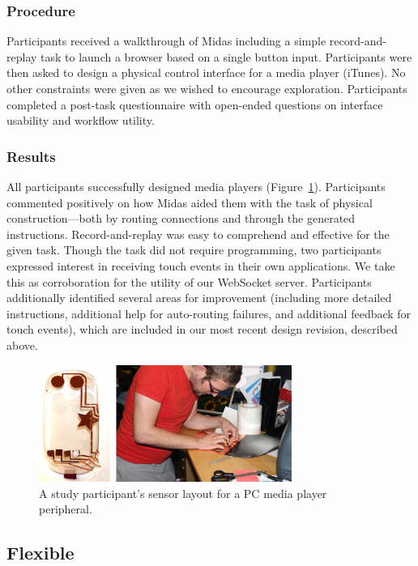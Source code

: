         \subsubsection{Procedure}
Participants received a walkthrough of Midas including a simple record-and-replay task to launch a browser based on a single button input. Participants were then asked to design a physical control interface for a media player (iTunes). No other constraints were given as we wished to encourage exploration. Participants completed a post-task questionnaire with open-ended questions on interface usability and workflow utility.

    \subsubsection{Results}
All participants successfully designed media players (Figure~\ref{fig:midas-study1}). Participants commented positively on how Midas aided them with the task of physical construction---both by routing connections and through the generated instructions. Record-and-replay was easy to comprehend and effective for the given task. Though the task did not require programming, two participants expressed interest in receiving touch events in their own applications. We take this as corroboration for the utility of our WebSocket server. Participants additionally identified several areas for improvement (including more detailed instructions, additional help for auto-routing failures, and additional feedback for touch events), which are included in our most recent design revision, described above.

\begin{figure}[t]
\centering
\includegraphics[width=3.25in]{figures/midas/study1.jpg}
\caption{A study participant's sensor layout for a PC media player peripheral.} 
\label{fig:midas-study1}
\end{figure}

    \subsection{Flexible}
    
